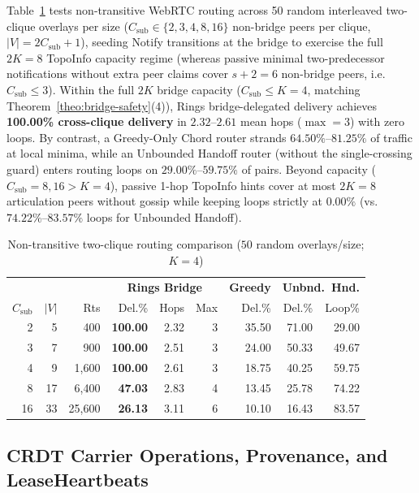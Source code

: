 \documentclass[journal]{IEEEtran}
\DeclareRobustCommand{\code}[1]{{\ttfamily\renewcommand{\_}{\textunderscore\allowbreak}#1}}
\begin{document}
Table~\ref{tab:two-clique} tests non-transitive WebRTC routing across 50 random interleaved two-clique overlays per size ($C_{\text{sub}}\in\{2,3,4,8,16\}$ non-bridge peers per clique, $|V|=2C_{\text{sub}}+1$), seeding \code{Notify} transitions at the bridge to exercise the full $2K=8$ \code{TopoInfo} capacity regime (whereas passive minimal two-predecessor notifications without extra peer claims cover $s+2=6$ non-bridge peers, i.e.\ $C_{\text{sub}}\le 3$). Within the full $2K$ bridge capacity ($C_{\text{sub}}\le K=4$, matching Theorem~\ref{theo:bridge-safety}(4)), Rings bridge-delegated delivery achieves \textbf{100.00\% cross-clique delivery} in $2.32$--$2.61$ mean hops ($\max=3$) with zero loops. By contrast, a Greedy-Only Chord router strands $64.50\%$--$81.25\%$ of traffic at local minima, while an Unbounded Handoff router (without the single-crossing guard) enters routing loops on $29.00\%$--$59.75\%$ of pairs. Beyond capacity ($C_{\text{sub}}=8,16 > K=4$), passive 1-hop \code{TopoInfo} hints cover at most $2K=8$ articulation peers without gossip while keeping loops strictly at $0.00\%$ (vs.\ $74.22\%$--$83.57\%$ loops for Unbounded Handoff).

\begin{table}[t]
\centering
\caption{Non-transitive two-clique routing comparison ($50$ random overlays/size; $K{=}4$)}
\label{tab:two-clique}
\scriptsize
\setlength{\tabcolsep}{2.2pt}
\begin{tabular}{@{}rrr|rrr|r|rr@{}}
\toprule
& & & \multicolumn{3}{c|}{\textbf{Rings Bridge}} & \textbf{Greedy} & \multicolumn{2}{c}{\textbf{Unbnd.\ Hnd.}} \\
$C_{\text{sub}}$ & $|V|$ & Rts & Del.\% & Hops & Max & Del.\% & Del.\% & Loop\% \\
\midrule
2  &  5 &    400 & \textbf{100.00} & 2.32 & 3 & 35.50 & 71.00 & 29.00 \\
3  &  7 &    900 & \textbf{100.00} & 2.51 & 3 & 24.00 & 50.33 & 49.67 \\
4  &  9 &  1,600 & \textbf{100.00} & 2.61 & 3 & 18.75 & 40.25 & 59.75 \\
8  & 17 &  6,400 & \textbf{47.03}  & 2.83 & 4 & 13.45 & 25.78 & 74.22 \\
16 & 33 & 25,600 & \textbf{26.13}  & 3.11 & 6 & 10.10 & 16.43 & 83.57 \\
\bottomrule
\end{tabular}
\end{table}

\subsection{CRDT Carrier Operations, Provenance, and LeaseHeartbeats}
\end{document}
